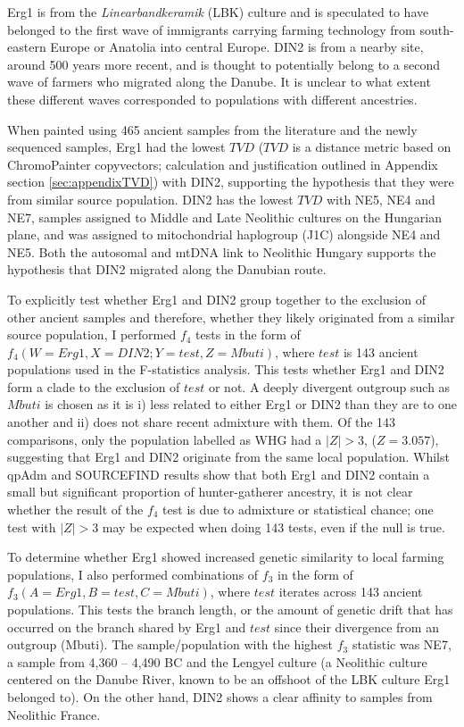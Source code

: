 Erg1 is from the \textit{Linearbandkeramik} (LBK) culture and is speculated to have belonged to the first wave of immigrants carrying farming technology from south-eastern Europe or Anatolia into central Europe. DIN2 is from a nearby site, around 500 years more recent, and is thought to potentially belong to a second wave of farmers who migrated along the Danube. It is unclear to what extent these different waves corresponded to populations with different ancestries.  

When painted using 465 ancient samples from the literature and the newly sequenced samples, Erg1 had the lowest $TVD$ ($TVD$ is a distance metric based on ChromoPainter copyvectors; calculation and justification outlined in Appendix section \ref{sec:appendixTVD}) with DIN2, supporting the hypothesis that they were from similar source population. DIN2  has the lowest $TVD$ with NE5, NE4 and NE7, samples assigned to Middle and Late Neolithic cultures on the Hungarian plane, and was assigned to mitochondrial haplogroup (J1C) alongside NE4 and NE5. Both the autosomal and mtDNA link to Neolithic Hungary supports the hypothesis that DIN2 migrated along the Danubian route.   

To explicitly test whether Erg1 and DIN2 group together to the exclusion of other ancient samples and therefore, whether they likely originated from a similar source population, I performed $f_{4}$ tests in the form of $f_{4}(W=Erg1, X=DIN2; Y=test, Z=Mbuti)$, where $test$ is 143 ancient populations used in the F-statistics analysis. This tests whether Erg1 and DIN2 form a clade to the exclusion of $test$ or not. A deeply divergent outgroup such as $Mbuti$ is chosen as it is i) less related to either Erg1 or DIN2 than they are to one another and ii) does not share recent admixture with them. Of the 143 comparisons, only the population labelled as WHG had a $|Z|>3$, ($Z=3.057$), suggesting that Erg1 and DIN2 originate from the same local population. Whilst qpAdm and SOURCEFIND results show that both Erg1 and DIN2 contain a small but significant proportion of hunter-gatherer ancestry, it is not clear whether the result of the $f_{4}$ test is due to admixture or statistical chance; one test with $|Z|>3$ may be expected when doing 143 tests, even if the null is true.

To determine whether Erg1 showed increased genetic similarity to local farming populations, I also performed combinations of $f_{3}$ in the form of $f_{3}(A=Erg1, B=test, C=Mbuti)$, where $test$ iterates across 143 ancient populations. This tests the branch length, or the amount of genetic drift that has occurred on the branch shared by Erg1 and $test$ since their divergence from an outgroup (Mbuti). The sample/population with the highest $f_{3}$ statistic was NE7, a sample from 4,360 – 4,490 BC and the Lengyel culture (a Neolithic culture centered on the Danube River, known to be an offshoot of the LBK culture Erg1 belonged to). On the other hand, DIN2 shows a clear affinity to samples from Neolithic France.

